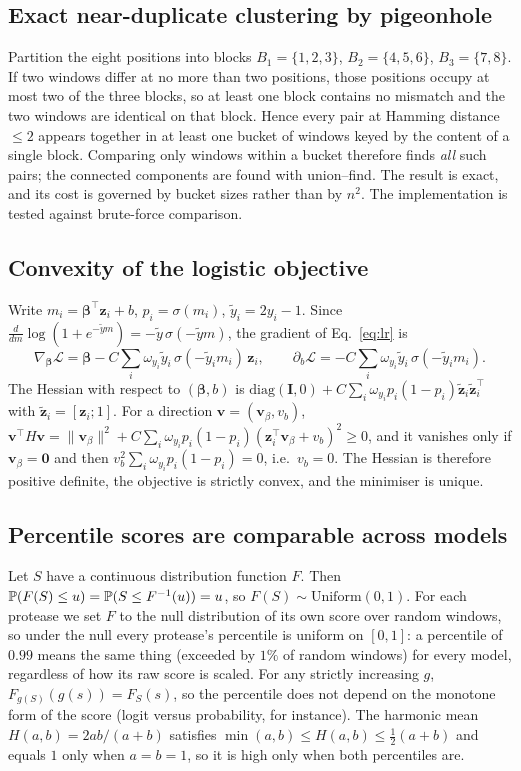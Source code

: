 \subsection{Exact near-duplicate clustering by pigeonhole}
Partition the eight positions into blocks $B_1=\{1,2,3\}$, $B_2=\{4,5,6\}$, $B_3=\{7,8\}$. If two windows differ at no more than two positions, those positions occupy at most two of the three blocks, so at least one block contains no mismatch and the two windows are identical on that block. Hence every pair at Hamming distance $\le2$ appears together in at least one bucket of windows keyed by the content of a single block. Comparing only windows within a bucket therefore finds \emph{all} such pairs; the connected components are found with union--find. The result is exact, and its cost is governed by bucket sizes rather than by $n^2$. The implementation is tested against brute-force comparison.

\subsection{Convexity of the logistic objective}
Write $m_i=\bm\beta^{\top}\bm z_i+b$, $p_i=\sigma(m_i)$, $\tilde y_i=2y_i-1$. Since $\frac{d}{dm}\log(1+e^{-\tilde ym})=-\tilde y\,\sigma(-\tilde ym)$, the gradient of Eq.~\eqref{eq:lr} is
\begin{equation}
\nabla_{\bm\beta}\mathcal{L}=\bm\beta-C\sum_i\omega_{y_i}\tilde y_i\,\sigma(-\tilde y_im_i)\,\bm z_i,\qquad
\partial_b\mathcal{L}=-C\sum_i\omega_{y_i}\tilde y_i\,\sigma(-\tilde y_im_i).
\end{equation}
The Hessian with respect to $(\bm\beta,b)$ is $\mathrm{diag}(\bm I,0)+C\sum_i\omega_{y_i}p_i(1-p_i)\tilde{\bm z}_i\tilde{\bm z}_i^{\top}$ with $\tilde{\bm z}_i=[\bm z_i;1]$. For a direction $\bm v=(\bm v_\beta,v_b)$, $\bm v^{\top}H\bm v=\|\bm v_\beta\|^2+C\sum_i\omega_{y_i}p_i(1-p_i)(\bm z_i^{\top}\bm v_\beta+v_b)^2\ge0$, and it vanishes only if $\bm v_\beta=\bm 0$ and then $v_b^2\sum_i\omega_{y_i}p_i(1-p_i)=0$, i.e.\ $v_b=0$. The Hessian is therefore positive definite, the objective is strictly convex, and the minimiser is unique.

\subsection{Percentile scores are comparable across models}
Let $S$ have a continuous distribution function $F$. Then $\mathbb{P}(F(S)\le u)=\mathbb{P}(S\le F^{-1}(u))=u$, so $F(S)\sim\mathrm{Uniform}(0,1)$. For each protease we set $F$ to the null distribution of its own score over random windows, so under the null every protease's percentile is uniform on $[0,1]$: a percentile of $0.99$ means the same thing (exceeded by $1\%$ of random windows) for every model, regardless of how its raw score is scaled. For any strictly increasing $g$, $F_{g(S)}(g(s))=F_S(s)$, so the percentile does not depend on the monotone form of the score (logit versus probability, for instance). The harmonic mean $H(a,b)=2ab/(a+b)$ satisfies $\min(a,b)\le H(a,b)\le\tfrac12(a+b)$ and equals $1$ only when $a=b=1$, so it is high only when both percentiles are.

